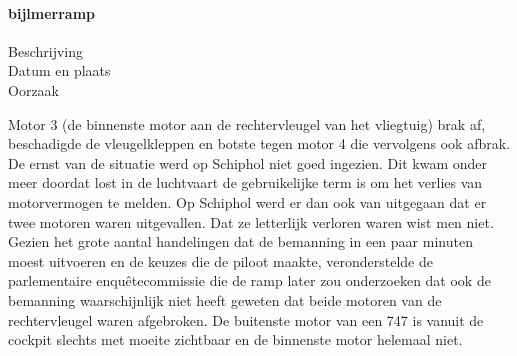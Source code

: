 \paragraph{bijlmerramp}

\begin{description}
	\item[Beschrijving]
	\item[Datum en plaats] 
	\item[Oorzaak]
\end{description}
Motor 3 (de binnenste motor aan de rechtervleugel van het vliegtuig) brak af, beschadigde de vleugelkleppen en botste tegen motor 4 die vervolgens ook afbrak.
De ernst van de situatie werd op Schiphol niet goed ingezien. Dit kwam onder meer doordat lost in de luchtvaart de gebruikelijke term is om het verlies van motorvermogen te melden. Op Schiphol werd er dan ook van uitgegaan dat er twee motoren waren uitgevallen. Dat ze letterlijk verloren waren wist men niet. Gezien het grote aantal handelingen dat de bemanning in een paar minuten moest uitvoeren en de keuzes die de piloot maakte, veronderstelde de parlementaire enquêtecommissie die de ramp later zou onderzoeken dat ook de bemanning waarschijnlijk niet heeft geweten dat beide motoren van de rechtervleugel waren afgebroken. De buitenste motor van een 747 is vanuit de cockpit slechts met moeite zichtbaar en de binnenste motor helemaal niet.

